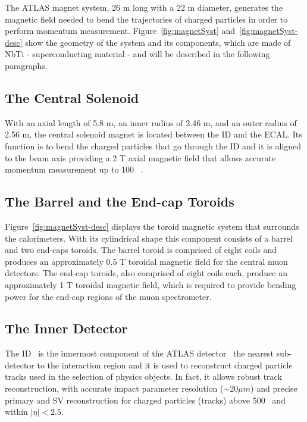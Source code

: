 			\noindent The \ac{ATLAS} magnet system, 26 m long with a 22 m diameter, generates the magnetic field needed to bend the trajectories of charged particles in order to perform momentum measurement. Figure~\ref{fig:magnetSyst} and~\ref{fig:magnetSyst-desc} show the geometry of the system and its components, which are made of NbTi - superconducting material - and will be described in the following paragraphs. 



			\subsection*{The Central Solenoid}

				With an axial length of 5.8 m, an inner radius of 2.46 m, and an outer radius of 2.56 m, the central solenoid magnet is located between the \ac{ID} and the \ac{ECAL}. Its function is to bend the charged particles that go through the \ac{ID} and it is aligned to the beam axis providing a 2 T axial magnetic field that allows accurate momentum measurement up to 100 \GeV~\cite{YAMAMOTO200853}.

			\subsection*{The Barrel and the End-cap Toroids}

				Figure~\ref{fig:magnetSyst-desc} displays the toroid magnetic system that surrounds the calorimeters. With its cylindrical shape this component consists of a barrel and two end-caps toroids. The barrel toroid is comprised of eight coils and produces an approximately 0.5 T toroidal magnetic field for the central muon detectors. The end-cap toroids, also comprised of eight coils each, produce an approximately 1 T toroidal magnetic field, which is required to provide bending power for the end-cap regions of the muon spectrometer.
				
		\subsection{The Inner Detector}
		\label{sec:ID}

			The \ac{ID}~\cite{ATLASInDet} is the innermost component of the \ac{ATLAS} detector \ie\ the nearest sub-detector to the interaction region and it is used to reconstruct charged particle tracks used in the selection of physics objects. In fact, it allows robust track reconstruction, with accurate impact parameter resolution ($\sim 20 \mu m$) and precise primary and \ac{SV} reconstruction for charged particles (tracks) above 500 \MeV\ and within $\displaystyle|\eta| < 2.5$.

